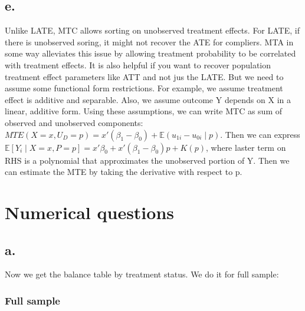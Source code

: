 \documentclass[
  letterpaper,
  DIV=11,
  numbers=noendperiod]{scrartcl}
\begin{document}
\subsection{e.}\label{e.}

Unlike LATE, MTC allows sorting on unobserved treatment effects. For
LATE, if there is unobserved soring, it might not recover the ATE for
compliers. MTA in some way alleviates this issue by allowing treatment
probability to be correlated with treatment effects. It is also helpful
if you want to recover population treatment effect parameters like ATT
and not jus the LATE. But we need to assume some functional form
restrictions. For example, we assume treatment effect is additive and
separable. Also, we assume outcome Y depends on X in a linear, additive
form. Using these assumptions, we can write MTC as sum of observed and
unobserved components:
\(MTE(X=x, U_D = p) = x'(\beta_1 - \beta_0) + \mathbb{E}(u_{1i} - u_{0i} \mid p)\).
Then we can express
\(\mathbb{E}[Y_i \mid X = x, P = p] = x' \beta_0 + x' (\beta_1 - \beta_0)p + K(p)\),
where laster term on RHS is a polynomial that approximates the
unobserved portion of Y. Then we can estimate the MTE by taking the
derivative with respect to p.

\section{Numerical questions}\label{numerical-questions}

\subsection{a.}\label{a.-1}

Now we get the balance table by treatment status. We do it for full
sample:

\subsubsection{Full sample}\label{full-sample}
\end{document}
